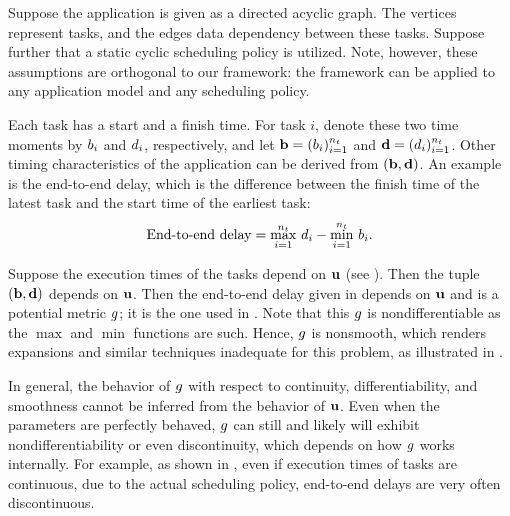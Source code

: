 Suppose the application is given as a directed acyclic graph. The vertices
represent tasks, and the edges data dependency between these tasks. Suppose
further that a static cyclic scheduling policy is utilized. Note, however, these
assumptions are orthogonal to our framework: the framework can be applied to any
application model and any scheduling policy.

Each task has a start and a finish time. For task $i$, denote these two time
moments by $b_i$ and $d_i$, respectively, and let $\mathbf{b} = (b_i)_{i=1}^{n_t}$ and
$\mathbf{d} = (d_i)_{i=1}^{n_t}$. Other timing characteristics of the application can be
derived from $(\mathbf{b}, \mathbf{d})$. An example is the end-to-end delay, which is the
difference between the finish time of the latest task and the start time of the
earliest task:
\begin{equation} \elab{end-to-end-delay}
  \text{End-to-end delay} = \max_{i = 1}^\nt \, \d_i - \min_{i = 1}^\nt \, \b_i.
\end{equation}

Suppose the execution times of the tasks depend on $\mathbf{u}$ (see ).
Then the tuple $(\mathbf{b}, \mathbf{d})$ depends on $\mathbf{u}$. Then the end-to-end delay given in
 depends on $\mathbf{u}$ and is a potential metric $g$; it is
the one used in . Note that this $g$ is nondifferentiable as the
$\max$ and $\min$ functions are such. Hence, $g$ is nonsmooth, which renders
 expansions and similar techniques inadequate for this problem, as
illustrated in .

\begin{remark} 
In general, the behavior of $g$ with respect to continuity, differentiability,
and smoothness cannot be inferred from the behavior of $\mathbf{u}$. Even when the
parameters are perfectly behaved, $g$ can still and likely will exhibit
nondifferentiability or even discontinuity, which depends on how $g$ works
internally. For example, as shown in \cite{tanasa2015}, even if execution times
of tasks are continuous, due to the actual scheduling policy, end-to-end delays
are very often discontinuous.
\end{remark}
